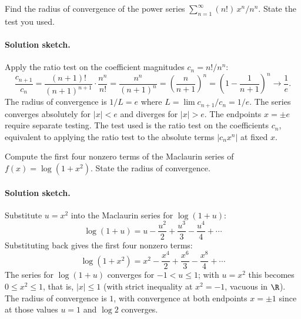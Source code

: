 \begin{exercise}
Find the radius of convergence of the power series
$\sum_{n=1}^{\infty} (n!) \, x^{n} / n^{n}$. State the test you used.

\paragraph{Solution sketch.} Apply the ratio test on the coefficient
magnitudes $c_{n} = n!/n^{n}$:
\[
\frac{c_{n+1}}{c_{n}} = \frac{(n+1)!}{(n+1)^{n+1}} \cdot \frac{n^{n}}{n!}
= \frac{n^{n}}{(n+1)^{n}} = \left(\frac{n}{n+1}\right)^{n} = \left(1 -
\frac{1}{n+1}\right)^{n} \to \frac{1}{e}.
\]
The radius of convergence is $1/L = e$ where $L = \lim c_{n+1}/c_{n}
= 1/e$. The series converges absolutely for $|x| < e$ and diverges
for $|x| > e$. The endpoints $x = \pm e$ require separate testing.
The test used is the ratio test on the coefficients
$c_{n}$, equivalent to applying the ratio test to the absolute terms
$|c_{n} x^{n}|$ at fixed $x$.
\end{exercise}

\begin{exercise}
Compute the first four nonzero terms of the Maclaurin series of
$f(x) = \log(1 + x^{2})$. State the radius of convergence.

\paragraph{Solution sketch.} Substitute $u = x^{2}$ into the
Maclaurin series for $\log(1 + u)$:
\[
\log(1 + u) = u - \frac{u^{2}}{2} + \frac{u^{3}}{3} - \frac{u^{4}}{4}
+ \cdots
\]
Substituting back gives the first four nonzero terms:
\[
\log(1 + x^{2}) = x^{2} - \frac{x^{4}}{2} + \frac{x^{6}}{3} -
\frac{x^{8}}{4} + \cdots
\]
The series for $\log(1 + u)$ converges for $-1 < u \leq 1$; with
$u = x^{2}$ this becomes $0 \leq x^{2} \leq 1$, that is, $|x| \leq 1$
(with strict inequality at $x^{2} = -1$, vacuous in $\R$). The
radius of convergence is $1$, with convergence at both endpoints
$x = \pm 1$ since at those values $u = 1$ and $\log 2$ converges.
\end{exercise}

